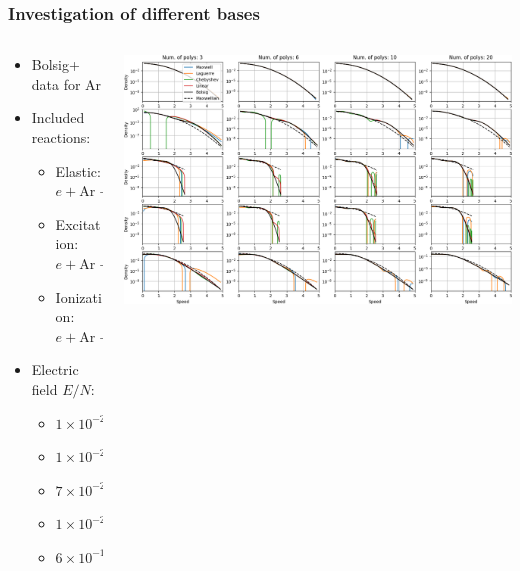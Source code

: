 \documentclass[mathserif, aspectratio=169]{beamer}
\begin{document}
\begin{frame}
\frametitle{Investigation of different bases}
%
\begin{columns}[T]
\begin{column}{0.3\linewidth}
\begin{itemize}
\item Bolsig+ data for Ar 
\item Included reactions:
\begin{itemize}
\item Elastic: $e + \text{Ar} \rightarrow e + \text{Ar}$
\item Excitation: $e + \text{Ar} \rightarrow e + \text{Ar}^*$
\item Ionization: $e + \text{Ar} \rightarrow e + \text{Ar}^+ + e$
\end{itemize}
\item Electric field $E/N$:
\begin{itemize}
\item $1\times 10^{-26}\, \text{V} \cdot \text{m}^2$
\item $1\times 10^{-24}\, \text{V} \cdot \text{m}^2$
\item $7\times 10^{-24}\, \text{V} \cdot \text{m}^2$
\item $1\times 10^{-23}\, \text{V} \cdot \text{m}^2$
\item $6\times 10^{-19}\, \text{V} \cdot \text{m}^2$
\end{itemize}
\end{itemize}
\end{column}
\begin{column}{0.7\linewidth}
  \vspace{-0.35in}
  \begin{center}
   \includegraphics[width=\textwidth]{figures/bolsig_visual.png}
  \end{center}
\end{column}
\end{columns}
%
\end{frame}
\end{document}
